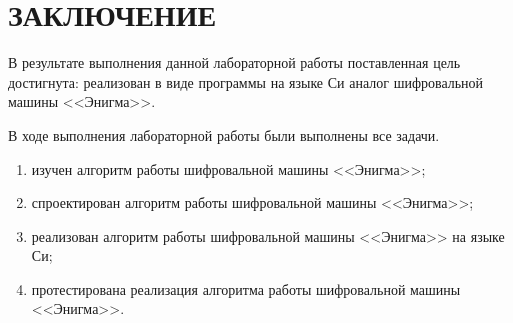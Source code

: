 \chapter*{ЗАКЛЮЧЕНИЕ}

В результате выполнения данной лабораторной работы поставленная цель достигнута: реализован в виде программы на языке Си аналог шифровальной машины  <<Энигма>>.

В ходе выполнения лабораторной работы были выполнены все задачи.

\begin{enumerate}[label=\arabic*)]
	\item изучен алгоритм работы шифровальной машины <<Энигма>>;
	\item спроектирован алгоритм работы шифровальной машины <<Энигма>>;
	\item реализован алгоритм работы шифровальной машины <<Энигма>> на языке Си;
	\item протестирована реализация алгоритма работы шифровальной машины  <<Энигма>>.
\end{enumerate}
